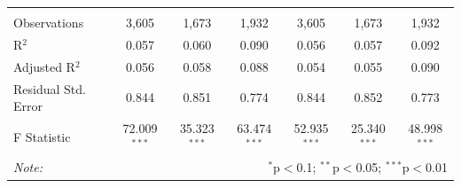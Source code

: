 \documentclass[alpha-refs]{wiley-article-01g}
\begin{document}
\begin{landscape}
\begin{table}[!htbp]
\begin{tabular}{@{\extracolsep{5pt}}lcccccc}
			& & & & & & \\ 
			\hline \\[-.8ex] 
			Observations & 3,605 & 1,673 & 1,932 & 3,605 & 1,673 & 1,932 \\ 
			R$^{2}$ & 0.057 & 0.060 & 0.090 & 0.056 & 0.057 & 0.092 \\ 
			Adjusted R$^{2}$ & 0.056 & 0.058 & 0.088 & 0.054 & 0.055 & 0.090 \\ 
			Residual Std. Error & 0.844 & 0.851 & 0.774 & 0.844 & 0.852 & 0.773 \\ 
			F Statistic & 72.009$^{***}$ & 35.323$^{***}$ & 63.474$^{***}$ & 52.935$^{***}$ & 25.340$^{***}$ & 48.998$^{***}$ \\ 
			\hline 
			\textit{Note:}  & \multicolumn{6}{r}{$^{*}$p$<$0.1; $^{**}$p$<$0.05; $^{***}$p$<$0.01} \\ 
		\end{tabular} 
	\end{table} 
	
\end{landscape}

\newpage
\end{document}
